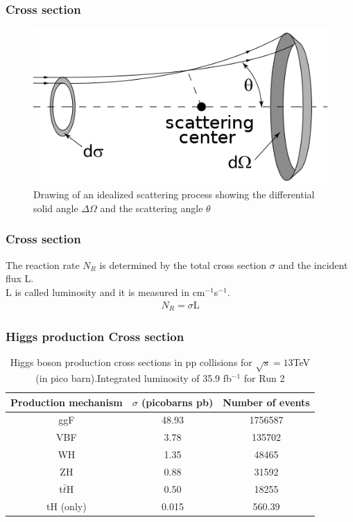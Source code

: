 \documentclass[11pt]{beamer}
\begin{document}
\begin{frame}
\frametitle{Cross section}
\begin{center}
	\begin{figure}
		\includegraphics[scale=0.5]{figures/cs1.png}
		\caption{Drawing of an idealized scattering process showing the differential solid angle $\Delta\Omega$ and the
			scattering angle $\theta$}
	\end{figure}
\end{center}
\end{frame}

\begin{frame}
\frametitle{Cross section}
The reaction rate $N_R$ is determined by the total cross section $\sigma$ and the incident flux L.\\
L is called luminosity and it is measured in cm$^{-1}$s$^{-1}$. 
\begin{align}
N_R=\sigma \text{L}
\end{align}
\end{frame}



\begin{frame}
\frametitle{Higgs production Cross section}
\begin{table}
	\caption*{Higgs boson production cross sections  in pp collisions for $\sqrt{s}=13$TeV  (in
		pico barn).Integrated luminosity of 35.9 fb$^{-1}$ for Run 2\footnotemark}
	\begin{tabular}{|c|c|c|}
		\hline
		Production mechanism &
		$\sigma$ (picobarns pb)
		&Number of events \\
		\hline
		ggF &
		48.93 &
		1756587\\
		\hline
		VBF &
		3.78&
		135702\\
		\hline
		WH & 1.35 & 48465\\
		\hline
		ZH &0.88 & 31592\\
		\hline
		t$\bar{t}$H &
		0.50&
		18255\\
		\hline
		tH	(only)&
		0.015&
		560.39\\
		\hline
	\end{tabular}
\end{table}


\end{frame}
\end{document}
